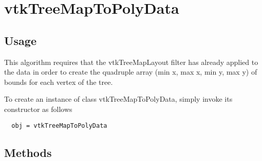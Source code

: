 \section{vtkTreeMapToPolyData}

\subsection{Usage}

 This algorithm requires that the vtkTreeMapLayout filter has already applied to the
 data in order to create the quadruple array (min x, max x, min y, max y) of
 bounds for each vertex of the tree.

To create an instance of class vtkTreeMapToPolyData, simply
invoke its constructor as follows
\begin{verbatim}
  obj = vtkTreeMapToPolyData
\end{verbatim}
\subsection{Methods}

